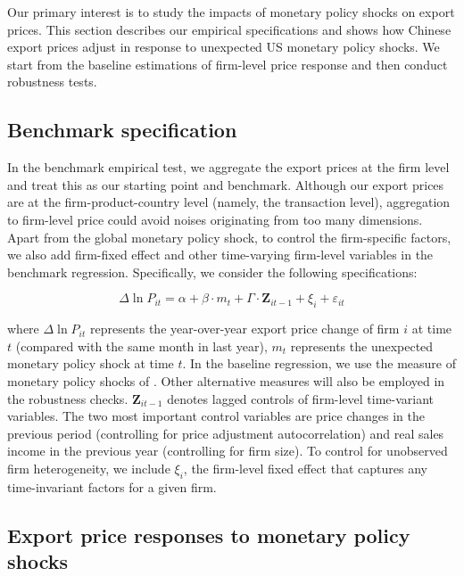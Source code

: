 Our primary interest is to study the impacts of monetary policy shocks on export prices. This section describes our empirical specifications and shows how Chinese export prices adjust in response to unexpected US monetary policy shocks. We start from the baseline estimations of firm-level price response and then conduct robustness tests.

\subsection{Benchmark specification}

In the benchmark empirical test, we aggregate the export prices at the firm level and treat this as our starting point and benchmark. Although our export prices are at the firm-product-country level (namely, the transaction level), aggregation to firm-level price could avoid noises originating from too many dimensions. Apart from the global monetary policy shock, to control the firm-specific factors, we also add firm-fixed effect and other time-varying firm-level variables in the benchmark regression. Specifically, we consider the following specifications:

\begin{equation}
    \Delta \ln P_{it} = \alpha+\beta \cdot m_{t}+ \Gamma \cdot \textbf{Z}_{it-1}+\xi_{i}+\varepsilon_{it}
\end{equation}

where $\Delta \ln P_{it}$ represents the year-over-year export price change of firm $i$ at time $t$ (compared with the same month in last year), $m_t$ represents the unexpected monetary policy shock at time $t$. In the baseline regression, we use the measure of monetary policy shocks of \cite{bu2021unified}. Other alternative measures will also be employed in the robustness checks. $\textbf{Z}_{it-1}$ denotes lagged controls of firm-level time-variant variables. The two most important control variables are price changes in the previous period (controlling for price adjustment autocorrelation) and real sales income in the previous year (controlling for firm size). To control for unobserved firm heterogeneity, we include $\xi_{i}$, the firm-level fixed effect that captures any time-invariant factors for a given firm.

\subsection{Export price responses to monetary policy shocks}


